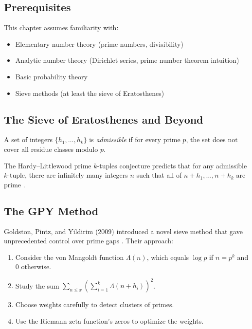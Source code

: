 \subsection{Prerequisites}
This chapter assumes familiarity with:
\begin{itemize}
\item Elementary number theory (prime numbers, divisibility)
\item Analytic number theory (Dirichlet series, prime number theorem intuition)
\item Basic probability theory
\item Sieve methods (at least the sieve of Eratosthenes)
\end{itemize}

\subsection{The Sieve of Eratosthenes and Beyond}

\begin{definition}
A set of integers $\{h_1, \ldots, h_k\}$ is \emph{admissible} if for every prime $p$, the set does not cover all residue classes modulo $p$.
\end{definition}

The Hardy--Littlewood prime $k$-tuples conjecture predicts that for any admissible $k$-tuple, there are infinitely many integers $n$ such that all of $n+h_1, \ldots, n+h_k$ are prime \cite{hardy1923}.

\subsection{The GPY Method}

Goldston, Pintz, and Yildirim (2009) introduced a novel sieve method that gave unprecedented control over prime gaps \cite{gpy2009}. Their approach:

\begin{enumerate}
\item Consider the von Mangoldt function $\Lambda(n)$, which equals $\log p$ if $n = p^k$ and 0 otherwise.
\item Study the sum $\sum_{n \leq x} \left(\sum_{i=1}^k \Lambda(n+h_i)\right)^2$.
\item Choose weights carefully to detect clusters of primes.
\item Use the Riemann zeta function's zeros to optimize the weights.
\end{enumerate}

